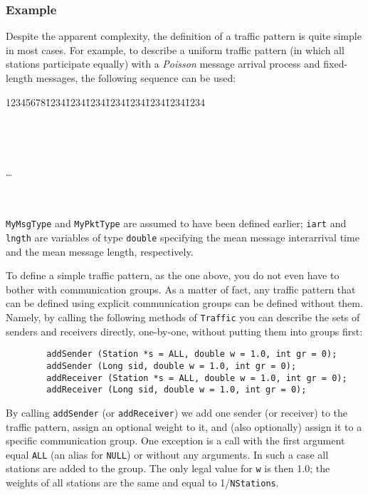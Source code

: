 \subsubsection*{Example}

\noindent
Despite the apparent complexity, the definition of a traffic pattern is quite
simple in most cases.
For example, to describe a uniform traffic pattern (in which all stations
participate equally) with a {\em Poisson\/} message arrival process and
fixed-length messages, the following sequence can be used:
{\tt\begin{tabbing}
12345678\=1234\=1234\=1234\=1234\=1234\=1234\=1234\=1234\kill
{}\\
\>{\tt \};}\\
\\
\\
\\
\> \ldots \\
\\
\\
\end{tabbing}}
\noindent
{\tt MyMsgType} and {\tt MyPktType} are assumed to have been defined earlier;
{\tt iart} and {\tt lngth} are variables of type {\tt double} specifying
the mean message interarrival time and the mean message length,
respectively.

\medskip

\noindent
To define a simple traffic pattern, as the one above, you do not even
have to bother with communication groups.
As a matter of fact, any traffic pattern that can be defined using explicit
communication groups can be defined without them.
Namely, by calling the following methods of {\tt Traffic} you can
describe the sets of senders and receivers directly, one-by-one,
without putting them into groups first:
\begin{verbatim}
        addSender (Station *s = ALL, double w = 1.0, int gr = 0);
        addSender (Long sid, double w = 1.0, int gr = 0);
        addReceiver (Station *s = ALL, double w = 1.0, int gr = 0);
        addReceiver (Long sid, double w = 1.0, int gr = 0);
\end{verbatim}

By calling {\tt addSender} (or {\tt addReceiver}) we add one sender
(or receiver)
to the traffic pattern, assign an optional weight to it, and (also
optionally) assign it to a specific communication group.
One exception is a call with the first argument equal {\tt ALL} (an alias for
{\tt NULL}) or without any arguments.
In such a case all stations are added to the group.
The only legal value for {\tt w} is then 1.0; the weights of all stations
are the same and equal to 1/{\tt NStations}.

